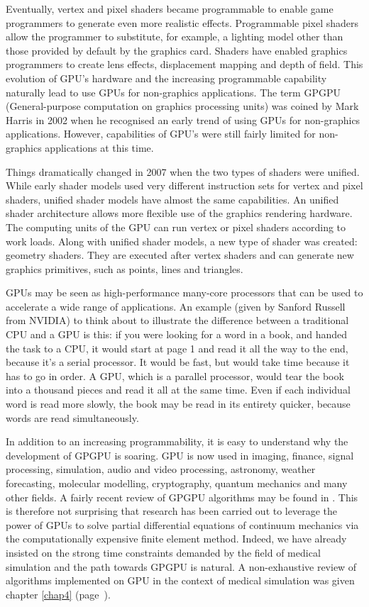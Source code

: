 Eventually, vertex and pixel shaders became programmable to enable game programmers to generate even more realistic effects. Programmable pixel shaders allow the programmer to substitute, for example, a lighting model other than those provided by default by the graphics card. Shaders have enabled graphics programmers to create lens effects, displacement mapping and depth of field. This evolution of GPU's hardware and the increasing programmable capability naturally lead to use GPUs for non-graphics applications. The term GPGPU (General-purpose computation on graphics processing units) was coined by Mark Harris in 2002 when he recognised an early trend of using GPUs for non-graphics applications. However, capabilities of GPU's were still fairly limited for non-graphics applications at this time. 

Things dramatically changed in 2007 when the two types of shaders were unified. While early shader models used very different instruction sets for vertex and pixel shaders, unified shader models have almost the same capabilities. An unified shader architecture allows more flexible use of the graphics rendering hardware. The computing units of the GPU can run vertex or pixel shaders according to work loads. Along with unified shader models, a new type of shader was created: geometry shaders. They are executed after vertex shaders and can generate new graphics primitives, such as points, lines and triangles. 

\bigskip

GPUs may be seen as high-performance many-core processors that can be used to accelerate a wide range of applications. An example (given by Sanford Russell from NVIDIA) to think about to illustrate the difference between a traditional CPU and a GPU is this: if you were looking for a word in a book, and handed the task to a CPU, it would start at page 1 and read it all the way to the end, because it's a serial processor. It would be fast, but would take time because it has to go in order. A GPU, which is a parallel processor, would tear the book into a thousand pieces and read it all at the same time. Even if each individual word is read more slowly, the book may be read in its entirety quicker, because words are read simultaneously. 

In addition to an increasing programmability, it is easy to understand why the development of GPGPU is soaring. GPU is now used in imaging, finance, signal processing, simulation, audio and video processing, astronomy, weather forecasting, molecular modelling, cryptography, quantum mechanics and many other fields. A fairly recent review of GPGPU algorithms may be found in \cite{Owens07}. This is therefore not surprising that research has been carried out to leverage the power of GPUs to solve partial differential equations of continuum mechanics via the computationally expensive finite element method. Indeed, we have already insisted on the strong time constraints demanded by the field of medical simulation and the path towards GPGPU is natural. A non-exhaustive review of algorithms implemented on GPU in the context of medical simulation was given chapter \ref{chap4} (page~\pageref{chap4:GPUMedicalSimulation}). 


